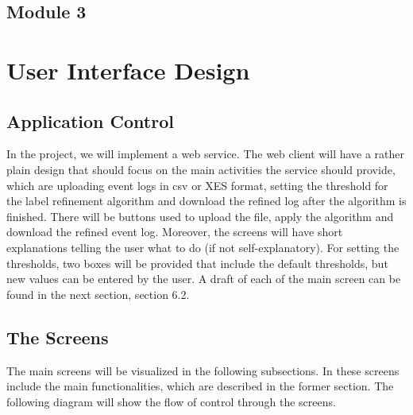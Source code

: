 \documentclass[notitlepage]{article}
\begin{document}
\begin{flushleft}




\subsection{Module 3}

\section{User Interface Design}
\subsection{Application Control}

In the project, we will implement a web service. The web client will have a rather plain design that should focus on the main activities the service should provide, which are uploading event logs in csv or XES format, setting the threshold for the label refinement algorithm and download the refined log after the algorithm is finished. There will be buttons used to upload the file, apply the algorithm and download the refined event log. Moreover, the screens will have short explanations telling the user what to do (if not self-explanatory). For setting the thresholds, two boxes will be provided that include the default thresholds, but new values can be entered by the user. A draft of each of the main screen can be found in the next section, section 6.2.

\subsection{The Screens}

The main screens will be visualized in the following subsections. In these screens include the main functionalities, which are described in the former section. The following diagram will show the flow of control through the screens.  


\end{flushleft}
\end{document}
